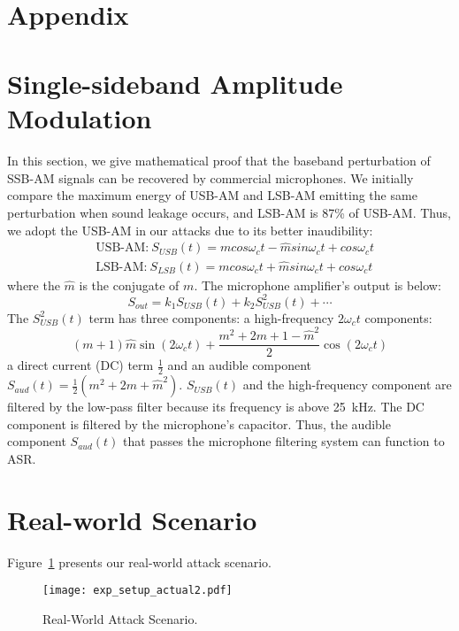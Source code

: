 ~
\section*{Appendix}
\setcounter{equation}{0}
\setcounter{subsection}{0}
\setcounter{section}{0}
\renewcommand{\theequation}{\arabic{equation}}
\renewcommand{\thesubsection}{\arabic{subsection}}
\renewcommand{\thesection}{\Alph{section}}

\section{Single-sideband Amplitude Modulation}\label{append:SSB}
In this section, we give mathematical proof that the baseband perturbation of SSB-AM signals can be recovered by commercial microphones. We initially compare the maximum energy of USB-AM and LSB-AM emitting the same perturbation when sound leakage occurs, and LSB-AM is 87\% of USB-AM. Thus, we adopt the USB-AM in our attacks due to its better inaudibility:
\begin{equation*}
\begin{aligned}
    & \text{USB-AM:}~ S_{USB}(t)=m{cos\omega_{c}t}-\hat{m}{sin\omega_{c}t}+cos\omega_{c}t\\
    & \text{LSB-AM:}~ S_{LSB}(t)=m{cos\omega_{c}t}+\hat{m}{sin\omega_{c}t}+cos\omega_{c}t
\end{aligned}
\label{equ:SSB_formula}
\end{equation*}
where the $\hat{m}$ is the conjugate of $m$. The microphone amplifier's output is below:
$$S_{out} = k_{1}S_{USB}(t) + k_{2}S_{USB}^2(t) + \cdots$$
The $S_{USB}^2(t)$ term has three components: a high-frequency $2\omega_{c}t$ components:
$$(m+1) \hat{m} \sin(2 \omega_c t)+\frac{m^2+2m+1-\hat{m}^2}{2} \cos(2\omega_c t)$$
a direct current (DC) term $\frac{1}{2}$ and an audible component $S_{aud}(t)=\frac{1}{2}(m^2+2m+\hat{m}^2)$.
$S_{USB}(t)$ and the high-frequency component are filtered by the low-pass filter because its frequency is above 25~kHz. The DC component is filtered by the microphone’s capacitor. Thus, the audible component $S_{aud}(t)$ that passes the microphone filtering system can function to ASR.
\vfill\eject

\section{Real-world Scenario}\label{append:attack_scenario}
Figure~\ref{fig:attack_actual} presents our real-world attack scenario.
\begin{figure}[h]
	\centering
	\texttt{[image: exp\_setup\_actual2.pdf]}
	\caption{\label{fig:attack_actual}Real-World Attack Scenario.}
\end{figure}



